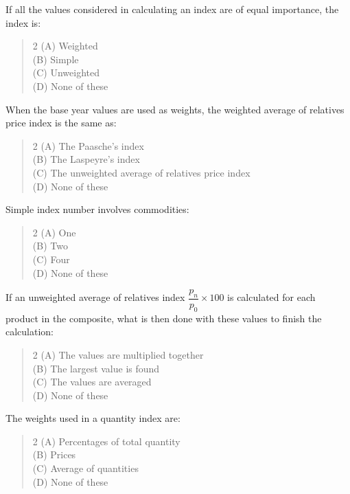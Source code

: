 \documentclass[11pt,a4paper]{article}
\begin{document}
\begin{mcqlist}
\item If all the values considered in calculating an index are of equal importance, the index is:
\begin{quote}\begin{multicols}{2}
\noindent (A) Weighted \\
(B) Simple \\
(C) Unweighted \\
(D) None of these
\end{multicols}\end{quote}

\item When the base year values are used as weights, the weighted average of relatives price index is the same as:
\begin{quote}\begin{multicols}{2}
\noindent (A) The Paasche's index \\
(B) The Laspeyre's index \\
(C) The unweighted average of relatives price index \\
(D) None of these
\end{multicols}\end{quote}

\item Simple index number involves commodities:
\begin{quote}\begin{multicols}{2}
\noindent (A) One \\
(B) Two \\
(C) Four \\
(D) None of these
\end{multicols}\end{quote}

\item If an unweighted average of relatives index $\dfrac{p_n}{p_0}\times 100$ is calculated for each product in the composite, what is then done with these values to finish the calculation:
\begin{quote}\begin{multicols}{2}
\noindent (A) The values are multiplied together \\
(B) The largest value is found \\
(C) The values are averaged \\
(D) None of these
\end{multicols}\end{quote}

\item The weights used in a quantity index are:
\begin{quote}\begin{multicols}{2}
\noindent (A) Percentages of total quantity \\
(B) Prices \\
(C) Average of quantities \\
(D) None of these
\end{multicols}\end{quote}


\end{mcqlist}
\end{document}

